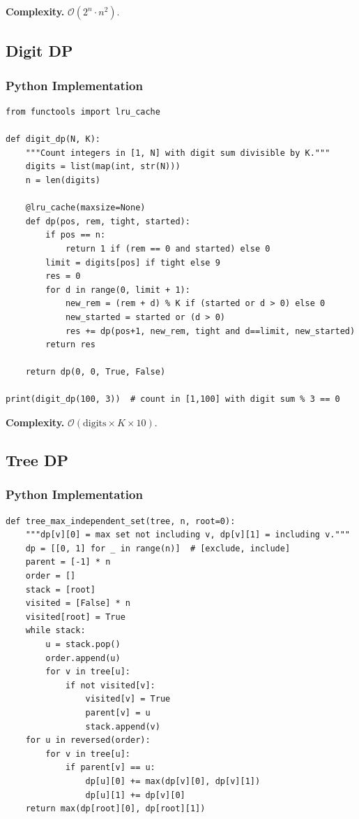 \documentclass[10pt,a4paper]{article}
\theoremstyle{cpstyle}
\newcommand{\bigO}[1]{\mathcal{O}\!\left(#1\right)}
\begin{document}
\textbf{Complexity.} $\bigO{2^n \cdot n^2}$.

\subsection{Digit DP}

\subsubsection{Python Implementation}
\begin{lstlisting}[caption={Digit DP -- count numbers with digit sum divisible by k}]
from functools import lru_cache

def digit_dp(N, K):
    """Count integers in [1, N] with digit sum divisible by K."""
    digits = list(map(int, str(N)))
    n = len(digits)

    @lru_cache(maxsize=None)
    def dp(pos, rem, tight, started):
        if pos == n:
            return 1 if (rem == 0 and started) else 0
        limit = digits[pos] if tight else 9
        res = 0
        for d in range(0, limit + 1):
            new_rem = (rem + d) % K if (started or d > 0) else 0
            new_started = started or (d > 0)
            res += dp(pos+1, new_rem, tight and d==limit, new_started)
        return res

    return dp(0, 0, True, False)

print(digit_dp(100, 3))  # count in [1,100] with digit sum % 3 == 0
\end{lstlisting}

\textbf{Complexity.} $\bigO{\text{digits} \times K \times 10}$.

\subsection{Tree DP}

\subsubsection{Python Implementation}
\begin{lstlisting}[caption={Tree DP -- maximum independent set on tree}]
def tree_max_independent_set(tree, n, root=0):
    """dp[v][0] = max set not including v, dp[v][1] = including v."""
    dp = [[0, 1] for _ in range(n)]  # [exclude, include]
    parent = [-1] * n
    order = []
    stack = [root]
    visited = [False] * n
    visited[root] = True
    while stack:
        u = stack.pop()
        order.append(u)
        for v in tree[u]:
            if not visited[v]:
                visited[v] = True
                parent[v] = u
                stack.append(v)
    for u in reversed(order):
        for v in tree[u]:
            if parent[v] == u:
                dp[u][0] += max(dp[v][0], dp[v][1])
                dp[u][1] += dp[v][0]
    return max(dp[root][0], dp[root][1])
\end{lstlisting}
\end{document}
